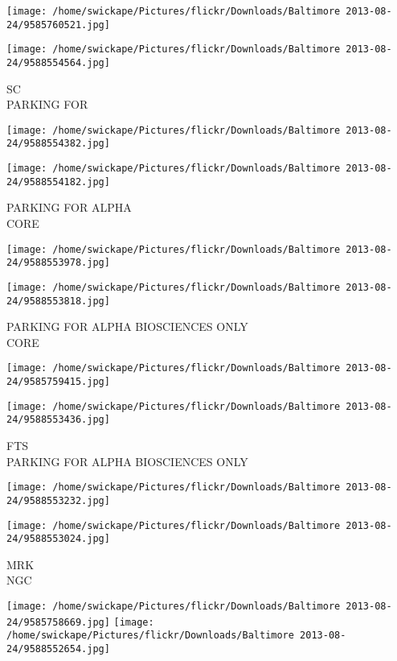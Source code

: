 \documentclass[10pt,letterpaper]{article}
\begin{document}
\texttt{[image: /home/swickape/Pictures/flickr/Downloads/Baltimore 2013-08-24/9585760521.jpg]}

\vspace{0.25in}
\texttt{[image: /home/swickape/Pictures/flickr/Downloads/Baltimore 2013-08-24/9588554564.jpg]}

SC\\
PARKING FOR
\pagebreak

\texttt{[image: /home/swickape/Pictures/flickr/Downloads/Baltimore 2013-08-24/9588554382.jpg]}

\vspace{0.25in}
\texttt{[image: /home/swickape/Pictures/flickr/Downloads/Baltimore 2013-08-24/9588554182.jpg]}

PARKING FOR ALPHA\\
CORE
\pagebreak

\texttt{[image: /home/swickape/Pictures/flickr/Downloads/Baltimore 2013-08-24/9588553978.jpg]}

\vspace{0.25in}
\texttt{[image: /home/swickape/Pictures/flickr/Downloads/Baltimore 2013-08-24/9588553818.jpg]}

PARKING FOR ALPHA BIOSCIENCES ONLY\\
CORE
\pagebreak

\texttt{[image: /home/swickape/Pictures/flickr/Downloads/Baltimore 2013-08-24/9585759415.jpg]}

\vspace{0.25in}
\texttt{[image: /home/swickape/Pictures/flickr/Downloads/Baltimore 2013-08-24/9588553436.jpg]}

FTS\\
PARKING FOR ALPHA BIOSCIENCES ONLY
\pagebreak

\texttt{[image: /home/swickape/Pictures/flickr/Downloads/Baltimore 2013-08-24/9588553232.jpg]}

\vspace{0.25in}
\texttt{[image: /home/swickape/Pictures/flickr/Downloads/Baltimore 2013-08-24/9588553024.jpg]}

MRK\\
NGC
\pagebreak

\texttt{[image: /home/swickape/Pictures/flickr/Downloads/Baltimore 2013-08-24/9585758669.jpg]}
\texttt{[image: /home/swickape/Pictures/flickr/Downloads/Baltimore 2013-08-24/9588552654.jpg]}
\end{document}
